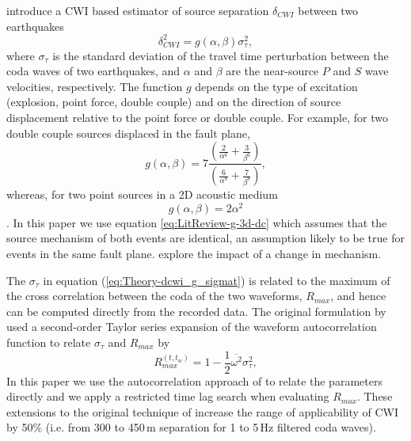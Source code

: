 \documentclass[extra, onecolumn, doublespacing]{gji}
\begin{document}
\citet{dr_Snieder05a} introduce a CWI based estimator of source
separation $\delta_{CWI}$ between two earthquakes
\begin{equation}
\label{eq:Theory-dcwi_g_sigmat}
\delta_{CWI}^2 = g(\alpha,\beta)\sigma_\tau^2,
\end{equation}
where $\sigma_\tau$ is the standard deviation of the travel time
perturbation between the coda waves of two earthquakes, and $\alpha$
and $\beta$ are the near-source $P$ and $S$ wave velocities,
respectively. The function $g$ depends on the type of excitation
(explosion, point force, double couple) and on the direction of
source displacement relative to the point force or double couple.
For example, for two double couple sources displaced in the fault
plane,
\begin{equation}
\label{eq:LitReview-g-3d-dc}
g(\alpha,\beta) = 7
\frac{\left(\frac{2}{\alpha^6}+\frac{3}{\beta^6}\right)}{\left(\frac{6}{\alpha^8}+\frac{7}{\beta^8}\right)},
\end{equation}
whereas, for two point sources in a 2D acoustic medium
\begin{equation}
\label{eq:LitReview-g-2d-ps} g(\alpha,\beta) = 2 \alpha^2
\end{equation}
\citep{dr_Snieder05a}. In this paper we use equation
\ref{eq:LitReview-g-3d-dc} which assumes that the source mechanism
of both events are identical, an assumption likely to be true for
events in the same fault plane. \cite{dr_Robinson07c} explore the
impact of a change in mechanism.

The $\sigma_\tau$ in equation (\ref{eq:Theory-dcwi_g_sigmat}) is
related to the maximum of the cross correlation between the coda of
the two waveforms, $R_{max}$, and hence can be computed directly
from the recorded data. The original formulation by
\citet{dr_Snieder05a} used a second-order Taylor series expansion of
the waveform autocorrelation function to relate $\sigma_\tau$ and
$R_{max}$ by
\begin{equation}
\label{eq:Rmax-disp-orig} R_{max}^{(t,t_w)} = 1 - \frac{1}{2}
\overline{\omega^2} \sigma_\tau^2,
\end{equation}
In this paper we use the autocorrelation approach of
\citet{dr_Robinson11a} to relate the parameters directly and we
apply a restricted time lag search when evaluating $R_{max}$. These
extensions to the original technique of \citet{dr_Snieder05a}
increase the range of applicability of CWI by 50\% (i.e. from 300 to
450\,m separation for 1 to 5\,Hz filtered coda waves).
\end{document}
